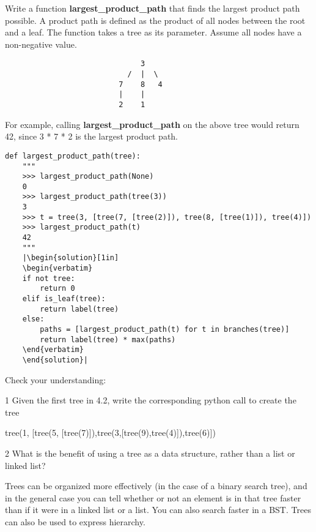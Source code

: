 \question
Write a function \textbf{largest\_product\_path} that finds the largest product path possible. A product path is defined as the product of all nodes between the root and a leaf. The function takes a tree as its parameter. Assume all nodes have a non-negative value.
\begin{verbatim}
                               3
                            /  |  \
                          7    8   4
                          |    |  
                          2    1    
\end{verbatim}

For example, calling \textbf{largest\_product\_path} on the above tree would return 42, since 3 * 7 * 2 is the largest product path.
\begin{lstlisting}
def largest_product_path(tree):
    """
    >>> largest_product_path(None)
    0
    >>> largest_product_path(tree(3))
    3
    >>> t = tree(3, [tree(7, [tree(2)]), tree(8, [tree(1)]), tree(4)])
    >>> largest_product_path(t)
    42
    """
    |\begin{solution}[1in]
    \begin{verbatim}
    if not tree:
        return 0
    elif is_leaf(tree):
        return label(tree)
    else:
        paths = [largest_product_path(t) for t in branches(tree)]
        return label(tree) * max(paths)
    \end{verbatim}
    \end{solution}|

\end{lstlisting}
\question 
Check your understanding:
\begin{paragraph}
1  Given the first tree in 4.2, write the corresponding python call to create the tree 
\end{paragraph}
\begin{solution}
tree(1, [tree(5, [tree(7)]),tree(3,[tree(9),tree(4)]),tree(6)])
\end{solution}
\begin{paragraph}
2 What is the benefit of using a tree as a data structure, rather than a list or linked list? 
\end{paragraph}
\begin{solution}
Trees can be organized more effectively (in the case of a binary search tree), and in the general case you can tell whether or not an element is in that tree faster than if it were in a linked list or a list. You can also search faster in a BST. Trees can also be used to express hierarchy. 
\end{solution}
